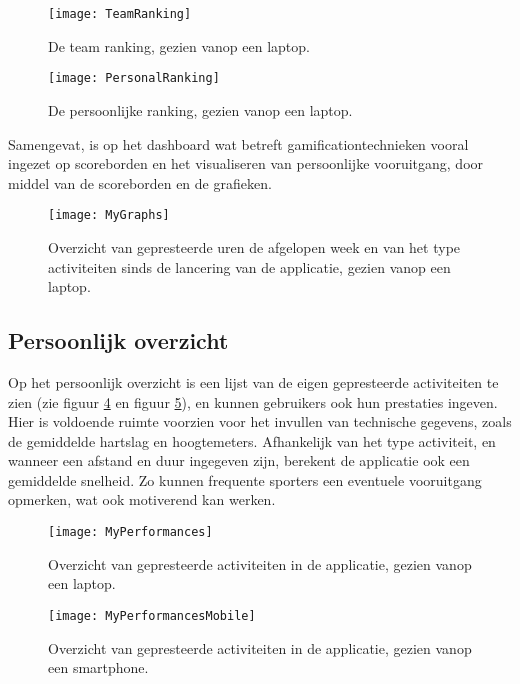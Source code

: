 \begin{figure}[h]
    \caption[Team ranking]{De team ranking, gezien vanop een laptop.}
    \texttt{[image: TeamRanking]}
    \label{fig:teamRanking}
\end{figure}

\begin{figure}[h]
    \caption[Persoonlijke ranking]{De persoonlijke ranking, gezien vanop een laptop.}
    \texttt{[image: PersonalRanking]}
    \label{fig:personalRanking}
\end{figure}

Samengevat, is op het dashboard wat betreft gamificationtechnieken vooral ingezet op scoreborden en het visualiseren van persoonlijke vooruitgang, door middel van de scoreborden en de grafieken.

\begin{figure}[h]
    \caption[Overzicht prestaties dashboard website]{Overzicht van gepresteerde uren de afgelopen week en van het type activiteiten sinds de lancering van de applicatie, gezien vanop een laptop.}
    \texttt{[image: MyGraphs]}
    \label{fig:graphs}
\end{figure}

\subsection{Persoonlijk overzicht}
Op het persoonlijk overzicht is een lijst van de eigen gepresteerde activiteiten te zien (zie figuur \ref{fig:performances} en figuur \ref{fig:performancesMobile}), en kunnen gebruikers ook hun prestaties ingeven. Hier is voldoende ruimte voorzien voor het invullen van technische gegevens, zoals de gemiddelde hartslag en hoogtemeters. Afhankelijk van het type activiteit, en wanneer een afstand en duur ingegeven zijn, berekent de applicatie ook een gemiddelde snelheid. Zo kunnen frequente sporters een eventuele vooruitgang opmerken, wat ook motiverend kan werken.

\begin{figure}[h]
    \caption[Overzicht activiteiten website]{Overzicht van gepresteerde activiteiten in de applicatie, gezien vanop een laptop.}
    \texttt{[image: MyPerformances]}
    \label{fig:performances}
\end{figure}

\begin{figure}[h]
    \caption[Overzicht activiteiten website smartphone]{Overzicht van gepresteerde activiteiten in de applicatie, gezien vanop een smartphone.}
    \texttt{[image: MyPerformancesMobile]}
    \label{fig:performancesMobile}
\end{figure}

